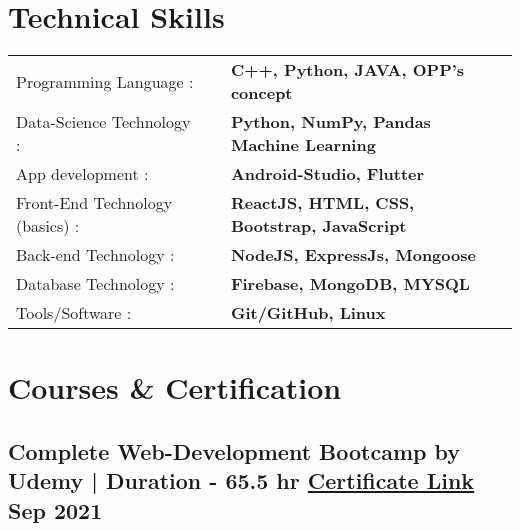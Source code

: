 \documentclass[a4,11pt]{article}
\begin{document}
\section{Technical Skills} 
\vspace{-0.1cm}
\begin{tabular}{p{15em} p{2em} p{43em}}
\normalsize{Programming Language :} && \textbf{C++, Python, JAVA, OPP’s concept}  \\
\normalsize{Data-Science Technology :} && \textbf{Python, NumPy, Pandas Machine Learning} \\ 
\normalsize{App development :} &&\textbf{Android-Studio, Flutter}  \\
\normalsize{Front-End Technology (basics) :} && \textbf{ReactJS, HTML, CSS, Bootstrap, JavaScript} \\
\normalsize{Back-end Technology :} && \textbf{NodeJS, ExpressJs, Mongoose} \\   
\normalsize{Database Technology :} && \textbf{Firebase, MongoDB, MYSQL}  \\
\normalsize{Tools/Software :} && \textbf{Git/GitHub, Linux} \\
\end{tabular}
\vspace{-0.4cm}

\section{Courses \& Certification}
\vspace{0.0cm}
\subsection*{Complete Web-Development Bootcamp \normalfont by Udemy | Duration - 65.5 hr   
\href{https://udemy-certificate.s3.amazonaws.com/pdf/UC-600df134-c5cd-4eaf-b831-221894c39239.pdf}{Certificate Link} 
\hfill  Sep 2021}
\vspace{0.2cm}



\end{document}
